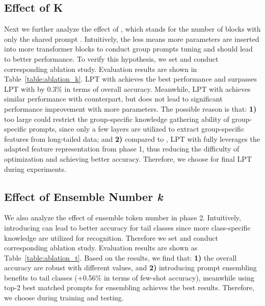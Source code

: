 \documentclass{article} \usepackage{iclr2023_conference,times}
\begin{document}
\begin{table}
   \renewcommand\arraystretch{1.3}
\centering
   \caption{Ablation Study of asymmetric GCL Loss. Introducing gradient re-weighting into GCL Loss can further improve overall accuracy in long-tailed classification. }
\setlength{\tabcolsep}{13.6pt} \renewcommand{\arraystretch}{2.2}{ \fontsize{8.3}{3}}
   \label{table:asym_gcl}
\end{table}

\subsection{Effect of K}\label{sec:ablatioin_k}
Next we further analyze the effect of , which stands for the number of blocks with only the shared prompt . Intuitively, the less  means more parameters are inserted into more transformer blocks to conduct group prompts tuning and should lead to better performance. To verify this hypothesis, we set  and conduct corresponding ablation study. Evaluation results are shown in Table~\ref{table:ablation_k}. LPT with  achieves the best performance and surpasses LPT with  by 0.3\% in terms of overall accuracy. Meanwhile, LPT with  achieves similar performance with  counterpart, but does not lead to significant performance improvement with more parameters. The possible reason is that: \textbf{1)} too large  could restrict the group-specific knowledge gathering ability of group-specific prompts, since only a few layers are utilized to extract group-specific features from long-tailed data; and \textbf{2)} compared to , LPT with  fully leverages the adapted feature representation from phase 1, thus reducing the difficulty of optimization and achieving better accuracy. Therefore, we choose  for final LPT during experiments.

\subsection{Effect of Ensemble Number \textit{k}}\label{sec:ablation_t}
We also analyze the effect of ensemble token number  in phase 2. Intuitively, introducing can lead to better accuracy for tail classes since more class-specific knowledge are utilized for recognition. Therefore we set  and conduct corresponding ablation study. Evaluation results are shown as Table~\ref{table:ablation_t}. Based on the results, we find that: \textbf{1)} the overall accuracy are robust with different  values, and \textbf{2)} introducing prompt ensembling benefits to tail classes (+0.56\% in terms of few-shot accuracy), meanwhile using top-2 best matched prompts for ensembling achieves the best results. Therefore, we choose  during training and testing.  
\end{document}
